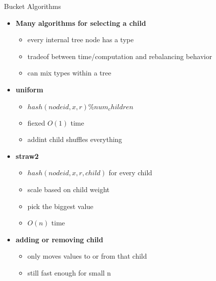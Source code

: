 \begin{frame}{Bucket Algorithms}
    \begin{itemize}
        \item \textbf{Many algorithms for selecting a child}
            \begin{itemize}
                \item every internal tree node has a type
                \item tradeof between time/computation and rebalancing behavior
                \item can mix types within a tree
            \end{itemize}
        \item \textbf{uniform}
            \begin{itemize}
                \item $hash(nodeid, x, r) \% num_children$
                \item fiexed $O(1)$ time
                \item addint child shuffles everything
            \end{itemize}
        \item \textbf{straw2}
            \begin{itemize}
                \item $hash(nodeid, x, r, child)$ for every child
                \item scale based on child weight
                \item pick the biggest value
                \item $O(n)$ time
            \end{itemize}
        \item \textbf{adding or removing child}
            \begin{itemize}
                \item only moves values to or from that child
                \item still fast enough for small n
            \end{itemize}
    \end{itemize}
\end{frame}

%    

    

%    

%    

